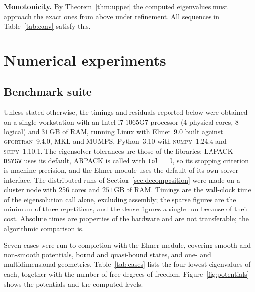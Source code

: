 \documentclass[pdflatex,sn-mathphys-num]{sn-jnl}
\theoremstyle{thmstyleone}%
\theoremstyle{thmstyletwo}%
\theoremstyle{thmstylethree}%
\begin{document}
\textbf{Monotonicity.} By Theorem~\ref{thm:upper} the computed eigenvalues must
approach the exact ones from above under refinement. All sequences in
Table~\ref{tab:conv} satisfy this.

\section{Numerical experiments}\label{sec:experiments}

\subsection{Benchmark suite}

Unless stated otherwise, the timings and residuals reported below were obtained
on a single workstation with an Intel i7-1065G7 processor (4 physical cores,
8\,logical) and $31$\,GB of RAM, running Linux with \textsf{Elmer}~9.0 built
against \textsc{gfortran}~9.4.0, MKL and MUMPS, \textsf{Python}~3.10 with
\textsc{numpy}~1.24.4 and \textsc{scipy}~1.10.1. The eigensolver tolerances are
those of the libraries: LAPACK \texttt{DSYGV} uses its default, ARPACK is called
with \texttt{tol}$~=0$, so its stopping criterion is machine precision, and the
Elmer module uses the default of its own solver interface. The distributed runs
of Section~\ref{sec:decomposition} were made on a cluster node with 256 cores
and $251$\,GB of RAM. Timings are the wall-clock time of the eigensolution call
alone, excluding assembly; the sparse figures are the minimum of three
repetitions, and the dense figures a single run because of their cost. Absolute
times are properties of the hardware and are not transferable; the algorithmic
comparison is.

Seven cases were run to completion with the \textsf{Elmer} module, covering
smooth and non-smooth potentials, bound and quasi-bound states, and one- and
multidimensional geometries. Table~\ref{tab:cases} lists the four lowest
eigenvalues of each, together with the number of free degrees of freedom.
Figure~\ref{fig:potentials} shows the potentials and the computed levels.
\end{document}

